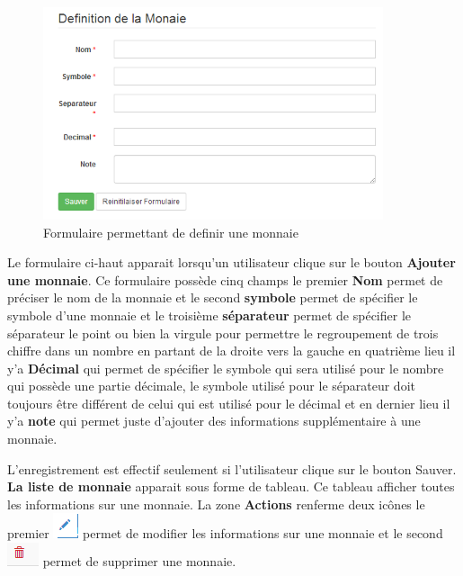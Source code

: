 \documentclass[12pt,a4paper]{report}
\begin{document}
\begin{figure}[h]
\begin{center}
\includegraphics[width=10cm]{pic/FormMonney.png}
\end{center}
\caption{Formulaire permettant de definir une monnaie}
\label{Formulaire permettant de definir une monnaie}
\end{figure}
\newpage
Le formulaire ci-haut apparait lorsqu'un utilisateur clique sur le bouton \textbf{Ajouter une monnaie}. Ce formulaire possède cinq champs le premier \textbf{Nom} permet de préciser le nom de la monnaie et le second \textbf{symbole} permet de spécifier le symbole d'une monnaie et le troisième \textbf{séparateur} permet de spécifier le séparateur le point ou bien la virgule pour permettre le regroupement de trois chiffre dans un nombre en partant de la droite vers la gauche en quatrième lieu il y'a \textbf{Décimal} qui permet de spécifier le symbole qui sera utilisé pour le nombre qui possède une partie décimale, le symbole utilisé pour le séparateur doit toujours être différent de celui qui est utilisé pour le décimal et en dernier lieu il y'a \textbf{note} qui permet juste d'ajouter des informations supplémentaire à une monnaie.

L'enregistrement est effectif seulement si l'utilisateur clique sur le bouton Sauver. \textbf{La liste de monnaie} apparait sous forme de tableau. Ce tableau afficher toutes les informations sur une monnaie. La zone \textbf{Actions} renferme deux icônes le premier \includegraphics[scale=0.7]{pic/EditUser.png}  permet de modifier les informations sur une monnaie et le second \includegraphics[scale=0.7]{pic/DeleteWRed.png} permet de supprimer une monnaie.
\newpage
\end{document}
